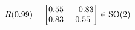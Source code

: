 \documentclass[preview]{standalone}
\begin{document}
\begin{align*}
\special{dvisvgm:raw <g id='unique000'>}R(0.99) = \begin{bmatrix} 0.55 & -0.83 \\ 0.83 & 0.55 \end{bmatrix} \in \text{SO}(2)\special{dvisvgm:raw </g>}
\end{align*}
\end{document}
